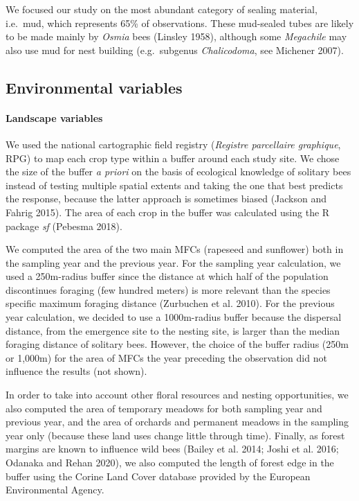 \documentclass[smallextended]{svjour3}       %
\begin{document}
We focused our study on the most abundant category of sealing material,
i.e.~mud, which represents 65\% of observations. These mud-sealed tubes
are likely to be made mainly by \emph{Osmia} bees (Linsley 1958),
although some \emph{Megachile} may also use mud for nest building
(e.g.~subgenus \emph{Chalicodoma}, see Michener 2007).

\hypertarget{environmental-variables}{%
\subsection{Environmental variables}\label{environmental-variables}}

\hypertarget{landscape-variables}{%
\paragraph{Landscape variables}\label{landscape-variables}}

We used the national cartographic field registry (\emph{Registre
parcellaire graphique}, RPG) to map each crop type within a buffer
around each study site. We chose the size of the buffer \emph{a priori}
on the basis of ecological knowledge of solitary bees instead of testing
multiple spatial extents and taking the one that best predicts the
response, because the latter approach is sometimes biased (Jackson and
Fahrig 2015). The area of each crop in the buffer was calculated using
the R package \emph{sf} (Pebesma 2018).

We computed the area of the two main MFCs (rapeseed and sunflower) both
in the sampling year and the previous year. For the sampling year
calculation, we used a 250m-radius buffer since the distance at which
half of the population discontinues foraging (few hundred meters) is
more relevant than the species specific maximum foraging distance
(Zurbuchen et al. 2010). For the previous year calculation, we decided
to use a 1000m-radius buffer because the dispersal distance, from the
emergence site to the nesting site, is larger than the median foraging
distance of solitary bees. However, the choice of the buffer radius
(250m or 1,000m) for the area of MFCs the year preceding the observation
did not influence the results (not shown).

In order to take into account other floral resources and nesting
opportunities, we also computed the area of temporary meadows for both
sampling year and previous year, and the area of orchards and permanent
meadows in the sampling year only (because these land uses change little
through time). Finally, as forest margins are known to influence wild
bees (Bailey et al. 2014; Joshi et al. 2016; Odanaka and Rehan 2020), we
also computed the length of forest edge in the buffer using the Corine
Land Cover database provided by the European Environmental Agency.
\end{document}
